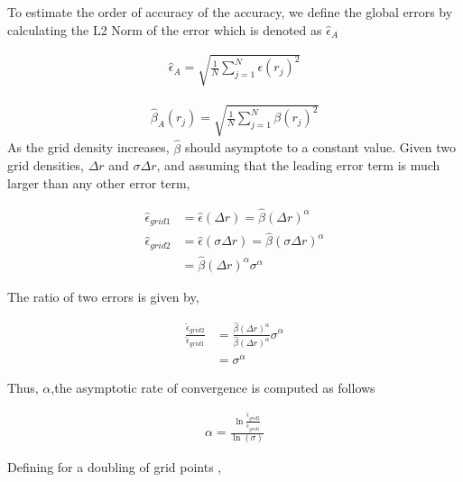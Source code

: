 \documentclass[12pt]{article}
\begin{document}
To estimate the order of accuracy of the accuracy, we define the global errors 
by calculating the L2 Norm of the error which is denoted as $\hat{\epsilon}_A$ 


\begin{align*}
    \hat{\epsilon}_A = \sqrt{\frac{1}{N}\sum_{j=1}^{N} \epsilon(r_j)^2  }
\end{align*}

\begin{align*}
    \hat{\beta}_A(r_j) = \sqrt{\frac{1}{N}\sum_{j=1}^{N} \beta(r_j)^2  }
\end{align*}
As the grid density increases, $\hat{\beta}$ should asymptote to a constant 
value. Given two grid densities, $\Delta r$ and $\sigma\Delta r$, and assuming
that the leading error term is much larger than any other error term,

\begin{align*}
    \hat{\epsilon}_{grid 1} &= \hat{\epsilon}(\Delta r) = \hat{\beta}(\Delta r)^{\alpha} \\
    \hat{\epsilon}_{grid 2} &= \hat{\epsilon}(\sigma \Delta r) = \hat{\beta}(\sigma \Delta r)^{\alpha} \\
                            &= \hat{\beta}(\Delta r)^{\alpha} \sigma^{\alpha}
\end{align*}

The ratio of two errors is given by,

\begin{align*}
    \frac{\hat{\epsilon}_{grid 2}}{\hat{\epsilon}_{grid 1}} &= 
    \frac{\hat{\beta}(\Delta r )^{\alpha}}{\hat{\beta}(\Delta r )^{\alpha}} \sigma^{\alpha} \\ &= \sigma^{\alpha}
\end{align*}

Thus, $\alpha$,the asymptotic rate of convergence is computed as follows 

\begin{align*}
    \alpha = \frac{
        \ln \frac{
            \hat{\epsilon}_{grid 2}
    }{\hat{\epsilon}_{grid 1} }}
    {\ln\left( \sigma \right) }
\end{align*}

Defining  for a doubling of grid points ,
\end{document}
